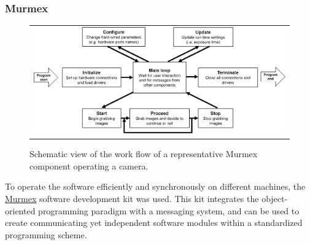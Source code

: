 \documentclass[12pt]{spieman}  %
\begin{document}
\subsubsection{Murmex}
\label{sec:murmex}
	\begin{figure}
   \begin{center}
   \begin{tabular}{c}
   \includegraphics[width=\textwidth]{murmex.eps}
   \end{tabular}
   \end{center}
   \caption{\label{fig:murmex} Schematic view of the work flow of a representative Murmex component operating a camera.} 
   \end{figure}

To operate the software efficiently and synchronously on different machines, the \href{http://sine.ni.com/nips/cds/view/p/lang/en/nid/212895}{Murmex} software development kit was used. This kit integrates the object-oriented programming paradigm with a messaging system, and can be used to create communicating yet independent software modules within a standardized programming scheme.
\end{document}
